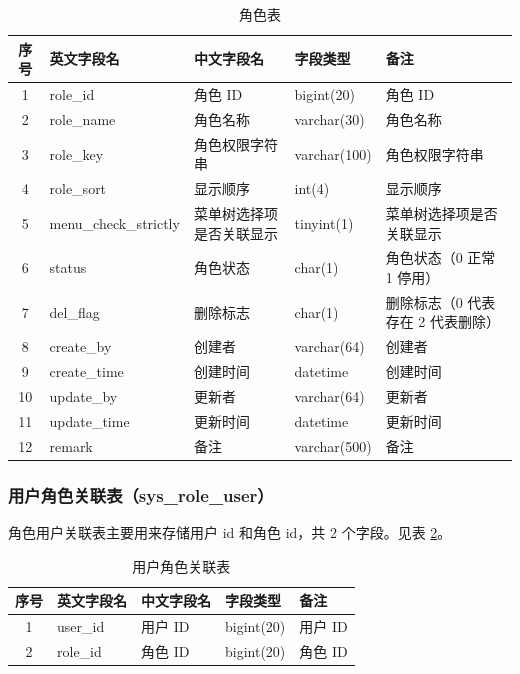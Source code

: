 \documentclass{izdthesis}
\begin{document}
\begin{table}[H]
  \centering
  \caption{角色表}
  \label{tab4-2}
  \songti
  \begin{tabular}{c l l l p{4.5cm}}
    \toprule
    序号 & 英文字段名 & 中文字段名 & 字段类型 & 备注 \\
    \midrule
    1 & role\_id & 角色 ID & bigint(20) & 角色 ID \\
    2 & role\_name & 角色名称 & varchar(30) & 角色名称 \\
    3 & role\_key & 角色权限字符串 & varchar(100) & 角色权限字符串 \\
    4 & role\_sort & 显示顺序 & int(4) & 显示顺序 \\
    5 & menu\_check\_strictly & 菜单树选择项是否关联显示 & tinyint(1) & 菜单树选择项是否关联显示 \\
    6 & status & 角色状态 & char(1) & 角色状态（0 正常 1 停用） \\
    7 & del\_flag & 删除标志 & char(1) & 删除标志（0 代表存在 2 代表删除） \\
    8 & create\_by & 创建者 & varchar(64) & 创建者 \\
    9 & create\_time & 创建时间 & datetime & 创建时间 \\
    10 & update\_by & 更新者 & varchar(64) & 更新者 \\
    11 & update\_time & 更新时间 & datetime & 更新时间 \\
    12 & remark & 备注 & varchar(500) & 备注 \\
    \bottomrule
  \end{tabular}
\end{table}

\subsubsection{用户角色关联表（sys\_role\_user）}
角色用户关联表主要用来存储用户 id 和角色 id，共 2 个字段。见表 \ref{tab4-3}。

\begin{table}[H]
  \centering
  \caption{用户角色关联表}
  \label{tab4-3}
  \songti
  \begin{tabular}{c l l l l}
    \toprule
    序号 & 英文字段名 & 中文字段名 & 字段类型 & 备注 \\
    \midrule
    1 & user\_id & 用户 ID & bigint(20) & 用户 ID \\
    2 & role\_id & 角色 ID & bigint(20) & 角色 ID \\
    \bottomrule
  \end{tabular}
\end{table}
\end{document}

